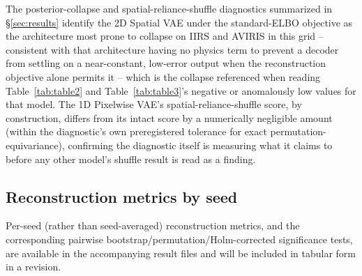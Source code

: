 \documentclass{article} %
\begin{document}
The posterior-collapse and spatial-reliance-shuffle diagnostics summarized in \S\ref{sec:results} identify the 2D Spatial VAE under the standard-ELBO objective as the architecture most prone to collapse on IIRS and AVIRIS in this grid -- consistent with that architecture having no physics term to prevent a decoder from settling on a near-constant, low-error output when the reconstruction objective alone permits it -- which is the collapse referenced when reading Table~\ref{tab:table2} and Table~\ref{tab:table3}'s negative or anomalously low values for that model. The 1D Pixelwise VAE's spatial-reliance-shuffle score, by construction, differs from its intact score by a numerically negligible amount (within the diagnostic's own preregistered tolerance for exact permutation-equivariance), confirming the diagnostic itself is measuring what it claims to before any other model's shuffle result is read as a finding.

\subsection{Reconstruction metrics by seed}
Per-seed (rather than seed-averaged) reconstruction metrics, and the corresponding pairwise bootstrap/permutation/Holm-corrected significance tests, are available in the accompanying result files and will be included in tabular form in a revision.
\end{document}
